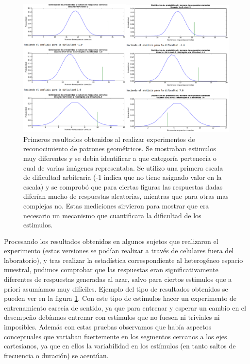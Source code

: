 \documentclass{article}
\begin{document}
    
    \begin{figure}
        \center
        \includegraphics[width=\textwidth]{Imagenes/ResultadosIniciales1.png}
        \caption{Primeros resultados obtenidos al realizar experimentos de reconocimiento de patrones geométricos. Se mostraban estimulos muy diferentes y se debía identificar a que categoría pertenecía o cual de varias imágenes representaba. Se utilizo una primera escala de dificultad arbitraria (-1 indica que no tiene asignado valor en la escala) y se comprobó que para ciertas figuras las respuestas dadas diferían mucho de respuestas aleatorias, mientras que para otras mas complejas no. Estas mediciones sirvieron para mostrar que era necesario un mecanismo que cuantificara la dificultad de los estimulos.}
        \label{fig:ResultadosPreliminar}
    \end{figure}  
    
    Procesando los resultados obtenidos en algunos sujetos que realizaron el experimento (estas versiones se podían realizar a través de celulares fuera del laboratorio), y tras realizar la estadística correspondiente al heterogéneo espacio muestral, pudimos comprobar que las respuestas eran significativamente diferentes de respuestas generadas al azar, salvo para ciertos estimulos que a priori asumíamos muy difíciles. Ejemplo del tipo de resultados obtenidos se pueden ver en la figura \ref{fig:ResultadosPreliminar}. Con este tipo de estimulos hacer un experimento de entrenamiento carecía de sentido, ya que para entrenar y esperar un cambio en el desempeño debíamos entrenar con estímulos que no fuesen ni triviales ni imposibles. Además con estas pruebas observamos que había aspectos conceptuales que variaban fuertemente en los segmentos cercanos a los ejes cartesianos, ya que en ellos la variabilidad en los estímulos (en tanto saltos de frecuencia o duración) se acentúan.
    
\end{document}
